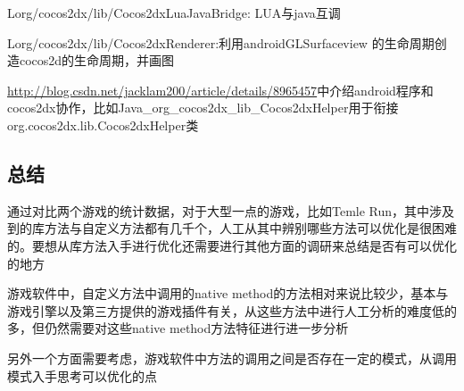 Lorg/cocos2dx/lib/Cocos2dxLuaJavaBridge: LUA与java互调

Lorg/cocos2dx/lib/Cocos2dxRenderer:利用androidGLSurfaceview 的生命周期创造cocos2d的生命周期，并画图

\url{http://blog.csdn.net/jacklam200/article/details/8965457}中介绍android程序和cocos2dx协作，比如Java\_org\_cocos2dx\_lib\_Cocos2dxHelper用于衔接org.cocos2dx.lib.Cocos2dxHelper类
 
\subsection{总结}
\label{sec:dexanalysis:conclusion}
通过对比两个游戏的统计数据，对于大型一点的游戏，比如Temle Run，其中涉及到的库方法与自定义方法都有几千个，人工从其中辨别哪些方法可以优化是很困难的。要想从库方法入手进行优化还需要进行其他方面的调研来总结是否有可以优化的地方

游戏软件中，自定义方法中调用的native method的方法相对来说比较少，基本与游戏引擎以及第三方提供的游戏插件有关，从这些方法中进行人工分析的难度低的多，但仍然需要对这些native method方法特征进行进一步分析

另外一个方面需要考虑，游戏软件中方法的调用之间是否存在一定的模式，从调用模式入手思考可以优化的点



